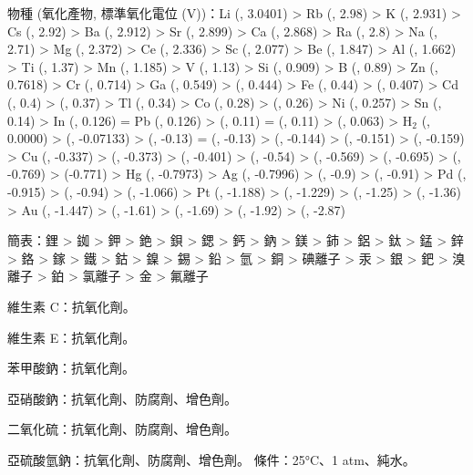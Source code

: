 \documentclass[a4paper,12pt]{report}
\begin{document}
物種 (氧化產物, 標準氧化電位 (V))：Li (, 3.0401) > Rb (, 2.98) > K (, 2.931) > Cs (, 2.92) > Ba (, 2.912) > Sr (, 2.899) > Ca (, 2.868) > Ra (, 2.8) > Na (, 2.71) > Mg (, 2.372) > Ce (, 2.336) > Sc (, 2.077) > Be (, 1.847) > Al (, 1.662) > Ti (, 1.37) > Mn (, 1.185) > V (, 1.13) > Si (, 0.909) > B (, 0.89) > Zn (, 0.7618) > Cr (, 0.714) > Ga (, 0.549) >  (, 0.444) > Fe (, 0.44) >  (, 0.407) > Cd (, 0.4) >  (, 0.37) > Tl (, 0.34) > Co (, 0.28) >  (, 0.26) > Ni (, 0.257) > Sn (, 0.14) > In (, 0.126) = Pb (, 0.126) >  (, 0.11) =  (, 0.11) >  (, 0.063) > H$_2$ (, 0.0000) >  (, -0.07133) >  (, -0.13) =  (, -0.13) >  (, -0.144) >  (, -0.151) >  (, -0.159) > Cu (, -0.337) >  (, -0.373) >  (, -0.401) >  (, -0.54) >  (, -0.569) >  (, -0.695) >  (, -0.769) >  (-0.771) > Hg (, -0.7973) > Ag (, -0.7996) >  (, -0.9) >  (, -0.91) > Pd (, -0.915) >  (, -0.94) >  (, -1.066) > Pt (, -1.188) >  (, -1.229) >  (, -1.25) >  (, -1.36) > Au (, -1.447) >  (, -1.61) >  (, -1.69) >  (, -1.92) >  (, -2.87)

簡表：鋰 > 銣 > 鉀 > 銫 > 鋇 > 鍶 > 鈣 > 鈉 > 鎂 > 鈰 > 鋁 > 鈦 > 錳 > 鋅 > 鉻 > 鎵 > 鐵 > 鈷 > 鎳 > 錫 > 鉛 > 氫 > 銅 > 碘離子 > 汞 > 銀 > 鈀 > 溴離子 > 鉑 > 氯離子 > 金 > 氟離子
\bit
\item 維生素 C：抗氧化劑。
\item 維生素 E：抗氧化劑。
\item 苯甲酸鈉：抗氧化劑。
\item 亞硝酸鈉：抗氧化劑、防腐劑、增色劑。
\item 二氧化硫：抗氧化劑、防腐劑、增色劑。
\item 亞硫酸氫鈉：抗氧化劑、防腐劑、增色劑。
\eit
{}
條件：25°C、1 atm、純水。
\end{document}
